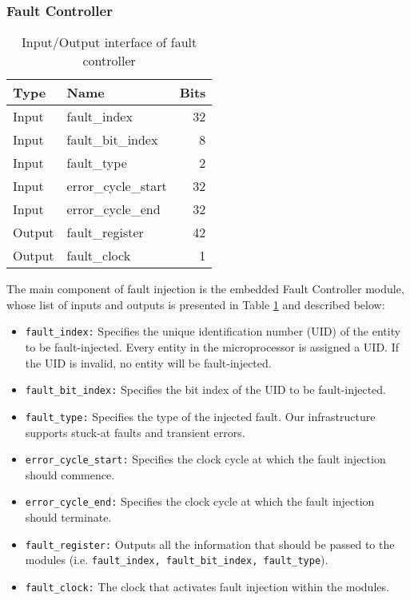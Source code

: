 \documentclass[12pt]{yalephd}
\begin{document}
\subsubsection{Fault Controller}\label{sC2Fault-Injection}

\begin{table}[!ht]
\caption{Input/Output interface of fault controller}\label{sC2Fault_Controller}
\begin{center}
\begin{tabular}{||l|l|r||}
\hline
\hline
{\bf Type} & {\bf Name} & {\bf Bits} \\
\hline
Input & fault\_index & 32 \\
\hline
Input & fault\_bit\_index & 8 \\
\hline
Input & fault\_type & 2 \\
\hline
Input & error\_cycle\_start & 32 \\
\hline
Input & error\_cycle\_end & 32 \\
\hline
Output & fault\_register & 42 \\
\hline
Output & fault\_clock & 1 \\
\hline
\hline
\end{tabular}
\end{center}
\end{table}

The main component of fault injection is the embedded Fault Controller module, whose list of inputs and outputs is presented in Table \ref{sC2Fault_Controller} and described below:
\begin{itemize}
\item{\tt fault\_index:} Specifies the unique identification number (UID) of the entity to be fault-injected. Every entity in the microprocessor is assigned a UID. If the UID is invalid, no entity will be fault-injected.
\item{\tt fault\_bit\_index:} Specifies the bit index of the UID to be fault-injected.
\item{\tt fault\_type:} Specifies the type of the injected fault. Our infrastructure supports stuck-at faults and transient errors.
\item{\tt error\_cycle\_start:} Specifies the clock cycle at which the fault injection should commence.
\item{\tt error\_cycle\_end:} Specifies the clock cycle at which the fault injection should terminate.
\item{\tt fault\_register:} Outputs all the information that should be passed to the modules (i.e. {\tt fault\_index, fault\_bit\_index, fault\_type}).
\item{\tt fault\_clock:} The clock that activates fault injection within the modules.
\end{itemize}
\end{document}
